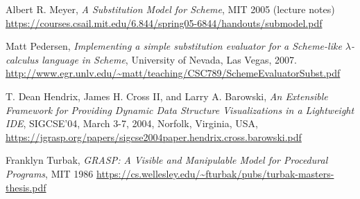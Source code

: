 \documentclass[acmsmall]{acmart}
\begin{document}
\begin{thebibliography}{12}
 Albert R. Meyer, \emph{A Substitution Model for Scheme},
  MIT 2005 (lecture notes) \\
  \url{https://courses.csail.mit.edu/6.844/spring05-6844/handouts/submodel.pdf}
  
 Matt Pedersen, \emph{Implementing a simple
substitution evaluator for a Scheme-like $\lambda$-calculus language
in Scheme}, University of Nevada, Las Vegas, 2007. \\
  \url{http://www.egr.unlv.edu/~matt/teaching/CSC789/SchemeEvaluatorSubst.pdf}
  
 T. Dean Hendrix, James H. Cross II, and Larry
  A. Barowski, \emph{An Extensible Framework for Providing Dynamic
  Data Structure Visualizations in a Lightweight IDE},  SIGCSE'04,
  March 3-7, 2004, Norfolk, Virginia, USA,
  \url{https://jgrasp.org/papers/sigcse2004paper.hendrix.cross.barowski.pdf}
  
 Franklyn Turbak, \emph{GRASP: A Visible and
Manipulable Model for Procedural Programs}, MIT 1986
  \url{https://cs.wellesley.edu/~fturbak/pubs/turbak-masters-thesis.pdf}

\end{thebibliography}
\end{document}
